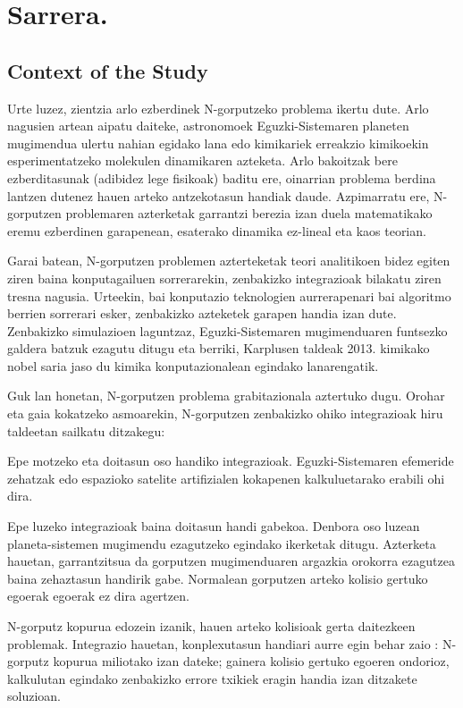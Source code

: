 \section{Sarrera.}

\subsection{Context of the Study}

Urte luzez, zientzia arlo ezberdinek N-gorputzeko problema ikertu dute. Arlo nagusien artean aipatu daiteke, astronomoek Eguzki-Sistemaren planeten mugimendua ulertu nahian egidako lana edo kimikariek erreakzio kimikoekin esperimentatzeko molekulen dinamikaren azteketa. Arlo bakoitzak bere ezberditasunak (adibidez lege fisikoak) baditu ere, oinarrian problema berdina lantzen dutenez hauen arteko antzekotasun handiak daude. Azpimarratu ere,  N-gorputzen problemaren azterketak garrantzi berezia izan duela matematikako eremu ezberdinen garapenean, esaterako dinamika ez-lineal eta kaos teorian. 

Garai batean, N-gorputzen problemen azterteketak teori analitikoen bidez egiten ziren baina konputagailuen sorrerarekin, zenbakizko integrazioak bilakatu ziren tresna nagusia. Urteekin, bai konputazio teknologien aurrerapenari bai algoritmo berrien sorrerari esker, zenbakizko azteketek garapen handia izan dute. Zenbakizko simulazioen laguntzaz, Eguzki-Sistemaren mugimenduaren funtsezko galdera batzuk ezagutu ditugu eta berriki, Karplusen taldeak 2013. kimikako nobel saria jaso du kimika konputazionalean egindako lanarengatik.       

Guk lan honetan, N-gorputzen problema grabitazionala aztertuko dugu. Orohar eta gaia kokatzeko asmoarekin, N-gorputzen zenbakizko ohiko integrazioak hiru taldeetan sailkatu ditzakegu:
\begin{enumerate}
{
\item Epe motzeko eta doitasun oso handiko integrazioak. 
 Eguzki-Sistemaren efemeride zehatzak edo espazioko satelite artifizialen kokapenen kalkuluetarako erabili ohi dira.
\item Epe luzeko integrazioak baina doitasun handi gabekoa.
 Denbora oso luzean planeta-sistemen mugimendu ezagutzeko egindako ikerketak ditugu. Azterketa hauetan, garrantzitsua da gorputzen mugimenduaren  argazkia orokorra ezagutzea baina zehaztasun handirik gabe. Normalean gorputzen arteko kolisio gertuko egoerak egoerak ez dira agertzen.     
\item N-gorputz kopurua edozein izanik, hauen arteko kolisioak gerta daitezkeen problemak.
 Integrazio hauetan, konplexutasun handiari aurre egin behar zaio : N-gorputz kopurua miliotako izan dateke; gainera kolisio gertuko egoeren ondorioz, kalkulutan egindako zenbakizko errore txikiek eragin handia izan ditzakete soluzioan.
    
}
\end{enumerate}

